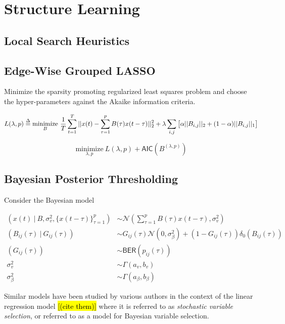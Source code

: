\documentclass[12pt]{article}
\begin{document}
\section{Structure Learning}
\label{sec:structure_learning}
\subsection{Local Search Heuristics}


\subsection{Edge-Wise Grouped LASSO}
Minimize the sparsity promoting regularized least squares problem and choose the hyper-parameters against the Akaike information criteria.

\begin{equation}
  L(\lambda, p) \overset{\Delta}{=} \underset{B}{\text{minimize}}\ \frac{1}{T}\sum_{t = 1}^T||x(t) - \sum_{\tau = 1}^pB(\tau)x(t - \tau)||_2^2 + \lambda \sum_{i, j}\big[\alpha||B_{i, j}||_2 + (1 - \alpha)||B_{i, j}||_1\big]
\end{equation}

\begin{equation}
  \underset{\lambda, p}{\text{minimize}}\ L(\lambda, p) + \mathsf{AIC}(B^{(\lambda, p)})
\end{equation}

\subsection{Bayesian Posterior Thresholding}
Consider the Bayesian model

\begin{equation}
  \begin{aligned}
    (x(t)\ |\ B, \sigma_v^2, \{x(t - \tau)\}_{\tau = 1}^p) &\sim \mathcal{N}(\sum_{\tau = 1}^pB(\tau)x(t - \tau), \sigma_v^2)\\
    (B_{ij}(\tau)\ |\ G_{ij}(\tau)) &\sim G_{ij}(\tau)\mathcal{N}(0, \sigma_\beta^2) + (1 - G_{ij}(\tau))\delta_0(B_{ij}(\tau))\\
    (G_{ij}(\tau)) &\sim \mathsf{BER}(p_{ij}(\tau))\\
    \sigma_v^2 &\sim \Gamma(a_v, b_v)\\
    \sigma_\beta^2 &\sim \Gamma(a_\beta, b_\beta)
  \end{aligned}
\end{equation}

Similar models have been studied by various authors in the context of the linear regression model \hl{[(cite them)]} where it is referred to as \textit{stochastic variable selection}, or referred to as a model for Bayesian variable selection.
\end{document}
